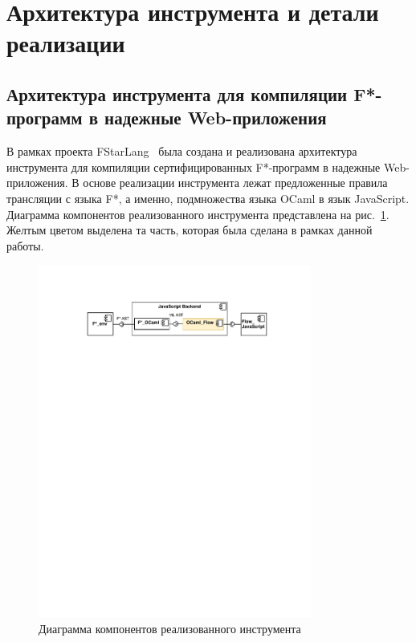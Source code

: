 \section{Архитектура инструмента и детали реализации}

\subsection{Архитектура инструмента для компиляции F*-программ в надежные Web-приложения}

В рамках проекта FStarLang~\cite{fstargh} была создана и реализована архитектура инструмента для компиляции сертифицированных F*-программ в надежные Web-приложения. В основе реализации инструмента лежат предложенные правила трансляции с языка F*, а именно, подмножества языка OCaml в язык JavaScript. Диаграмма компонентов реализованного инструмента представлена на рис.~\ref{fig:arch_js}. Желтым цветом выделена та часть, которая была сделана в рамках данной работы.

\begin{figure}[h!]
\begin{center}
\includegraphics[width=0.8\textwidth]{Polubelova/DiagComp}
\caption{Диаграмма компонентов реализованного инструмента}
\label{fig:arch_js} 
\end{center}
\end{figure}

